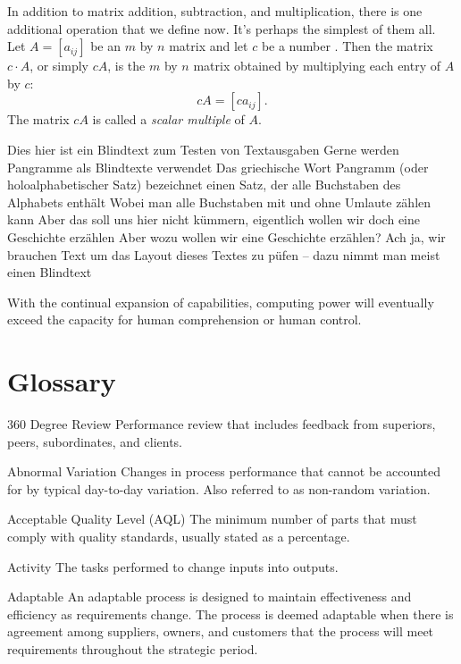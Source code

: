 In addition to matrix addition, subtraction, and multiplication, there is 
one additional operation that we define now. It's perhaps the simplest of 
them all. Let $A=[a_{ij}]$ be an $m$ by $n$ matrix and let $c$ be a 
number \cite{hyvarinen2001ica}. Then the matrix $c\cdot A$, or simply $cA$, is the $m$ by $n$ 
matrix obtained by multiplying each entry of $A$ by $c$:
\[c A=[ca_{ij}].\] 
The matrix $c A$ is called a {\it scalar multiple} of $A$.

\begin{VT1}


Dies hier ist ein Blindtext zum Testen von
Textausgaben 
  Gerne werden Pangramme als Blindtexte
verwendet 
  Das griechische Wort Pangramm (oder holoalphabetischer Satz)
bezeichnet einen Satz, der alle Buchstaben des Alphabets
enth\"alt 
  Wobei man   alle Buchstaben  mit und ohne Umlaute z\"ahlen
kann 
  Aber das soll uns hier nicht k\"ummern, eigentlich wollen wir doch
eine Geschichte erz\"ahlen 
  Aber wozu wollen wir eine Geschichte erz\"ahlen? 
  Ach ja, wir brauchen Text um das Layout dieses Textes zu p\"ufen --
dazu nimmt man meist einen Blindtext

\VT
With the continual expansion of capabilities, computing power will eventually exceed the capacity for human
comprehension or human control.

\end{VT1}


\section{Glossary}
\begin{Glossary}
\item[360 Degree Review] Performance review that includes feedback from superiors, peers, subordinates, and clients.
\item[Abnormal Variation] Changes in process performance that cannot be accounted for by typical day-to-day variation. Also referred to as
non-random variation.
\item[Acceptable Quality Level (AQL)] The minimum number of parts that must comply with quality standards, usually stated as a percentage.
\item[Activity] The tasks performed to change inputs into outputs.
\item[Adaptable] An adaptable process is designed to maintain effectiveness and efficiency as requirements change. The process is
deemed adaptable when there is agreement among suppliers, owners, and customers that the process will meet
requirements throughout the strategic period.
\end{Glossary}



